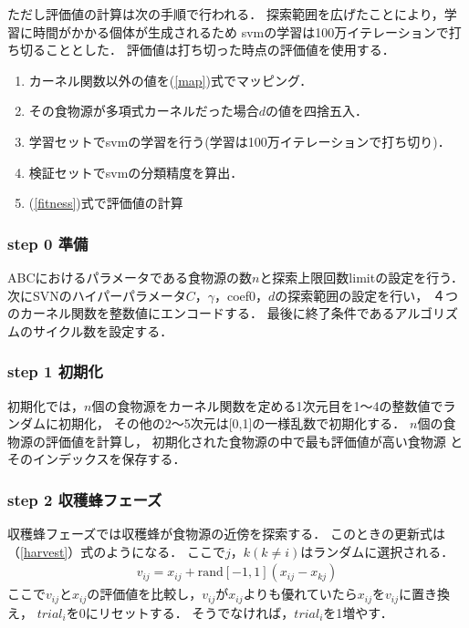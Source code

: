 ただし評価値の計算は次の手順で行われる．
探索範囲を広げたことにより，学習に時間がかかる個体が生成されるため
svmの学習は100万イテレーションで打ち切ることとした．
評価値は打ち切った時点の評価値を使用する．
\begin{enumerate}
    \item カーネル関数以外の値を(\ref{map})式でマッピング．
    \item その食物源が多項式カーネルだった場合$d$の値を四捨五入．
    \item 学習セットでsvmの学習を行う(学習は100万イテレーションで打ち切り)．
    \item 検証セットでsvmの分類精度を算出．
    \item (\ref{fitness})式で評価値の計算
\end{enumerate}

\subsubsection*{step 0 準備}
ABCにおけるパラメータである食物源の数$n$と探索上限回数limitの設定を行う．
次にSVNのハイパーパラメータ$C$，$\gamma$，coef0，$d$の探索範囲の設定を行い，
４つのカーネル関数を整数値にエンコードする．
最後に終了条件であるアルゴリズムのサイクル数を設定する．
\subsubsection*{step 1 初期化}
初期化では，$n$個の食物源をカーネル関数を定める1次元目を1〜4の整数値でランダムに初期化，
その他の2〜5次元は[0,1]の一様乱数で初期化する．
$n$個の食物源の評価値を計算し，
初期化された食物源の中で最も評価値が高い食物源
とそのインデックスを保存する．
\subsubsection*{step 2 収穫蜂フェーズ}
収穫蜂フェーズでは収穫蜂が食物源の近傍を探索する．
このときの更新式は（\ref{harvest}）式のようになる．
ここで$j，k(k\neq i)$はランダムに選択される．
\begin{align}
v_{ij} = x_{ij} + \mathrm{rand}[-1,1](x_{ij}-x_{kj})
\end{align}
ここで$v_{ij}$と$x_{ij}$の評価値を比較し，$v_{ij}$が$x_{ij}$よりも優れていたら$x_{ij}$を$v_{ij}$に置き換え，
$trial_i$を0にリセットする．
そうでなければ，$trial_i$を1増やす．
